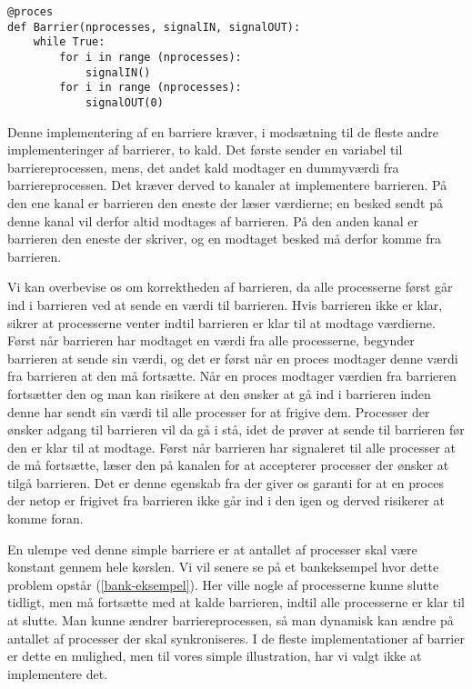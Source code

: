 \begin{lstlisting}[float, label=barrier-imp,caption=En barriere i \pycsp]
@proces
def Barrier(nprocesses, signalIN, signalOUT):
	while True:
		for i in range (nprocesses):
			signalIN()
		for i in range (nprocesses):
			signalOUT(0)
\end{lstlisting}

Denne implementering af en barriere kræver, i modsætning til de fleste andre 
implementeringer af barrierer\cites{mpi-barrier, crew}, to kald. Det første 
sender en variabel til barriereprocessen, mens,
det andet kald modtager en dummyværdi fra barriereprocessen. Det kræver derved 
to kanaler at implementere barrieren. På den ene kanal er barrieren den eneste 
der læser værdierne; en besked sendt på denne kanal vil derfor altid modtages 
af barrieren. På den anden kanal er barrieren den eneste der skriver, og en 
modtaget besked må derfor komme fra barrieren.

Vi kan overbevise os om korrektheden af barrieren, da alle processerne først 
går ind i barrieren ved at sende en værdi til barrieren. Hvis barrieren ikke er 
klar, sikrer \csp at processerne venter indtil barrieren er klar til at modtage 
værdierne. Først når barrieren har modtaget en værdi fra alle processerne, 
begynder barrieren at sende sin værdi, og det er først når en proces modtager 
denne værdi fra barrieren at den må fortsætte. Når en proces modtager værdien 
fra barrieren fortsætter den og man kan risikere at den ønsker at gå ind i 
barrieren inden denne har sendt sin værdi til alle processer for at frigive dem.
Processer der ønsker adgang til barrieren vil da gå i stå, idet de prøver at 
sende til barrieren før den er klar til at modtage. Først 
når barrieren har signaleret til alle processer at de må fortsætte, læser den 
på kanalen for at accepterer processer der ønsker at tilgå barrieren. Det er 
denne egenskab fra \csp der giver os garanti for at en proces der netop er 
frigivet fra barrieren ikke går ind i den igen og derved risikerer at komme 
foran. 

En ulempe ved denne simple barriere er at antallet af processer skal være 
konstant gennem hele kørslen.
Vi vil senere se på et bankeksempel hvor dette problem opstår (\cref{bank-eksempel}). Her ville nogle af 
processerne kunne slutte tidligt, men må fortsætte med  at kalde barrieren, indtil alle processerne er klar til at slutte.
Man kunne ændrer barriereprocessen, så man dynamisk kan ændre på antallet af processer der 
skal synkroniseres. I de fleste implementationer af barrier er dette en mulighed, men til vores simple illustration, har vi valgt ikke at implementere det.

